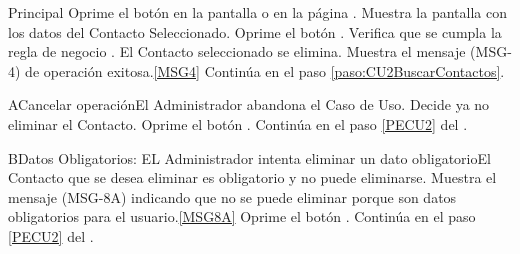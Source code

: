 	\begin{UCtrayectoria}{Principal}
			\UCpaso[\UCactor] Oprime el botón  en la pantalla  o en la página .
			\UCpaso Muestra la pantalla  con los datos del Contacto Seleccionado. 
			\UCpaso [\UCactor] Oprime el botón . 
			\UCpaso Verifica que se cumpla la regla de negocio . 
			\UCpaso El Contacto seleccionado se elimina.
			\UCpaso Muestra el mensaje (MSG-4) de operación exitosa.\ref{MSG4}
			\UCpaso Continúa en el paso \ref{paso:CU2BuscarContactos}.
	\end{UCtrayectoria}

		\begin{UCtrayectoriaA}{A}{Cancelar operación}{El Administrador abandona el Caso de Uso.}
			\UCpaso[\UCactor] Decide ya no eliminar el Contacto. \label{Datos_Asoc_Contactos}
			\UCpaso[\UCactor] Oprime el botón .
			\UCpaso Continúa en el paso \ref{PECU2} del .
		\end{UCtrayectoriaA}

		\begin{UCtrayectoriaA}{B}{Datos Obligatorios: EL Administrador intenta eliminar un dato obligatorio}{El Contacto que se desea eliminar es obligatorio y no puede eliminarse.}
			\UCpaso Muestra el mensaje (MSG-8A) indicando que no se puede eliminar porque son datos obligatorios para el usuario.\ref{MSG8A}
			\UCpaso [\UCactor] Oprime el botón .
			\UCpaso Continúa en el paso \ref{PECU2} del .
		\end{UCtrayectoriaA}
